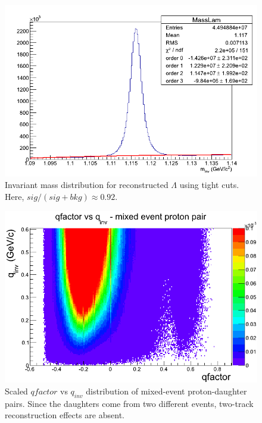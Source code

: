 \begin{figure}[hbtp]
\includegraphics[scale=0.5]{11h_V0_MassLam_TightCuts.png}
\caption[Invariant mass distribution for reconstructed $\Lambda$ using tight cuts]{Invariant mass distribution for reconstructed $\Lambda$ using tight cuts.  Here, $sig/(sig+bkg) \approx 0.92$.}
\label{fig:MassTightCut}
\end{figure}

\begin{figure}[hbtp]
\includegraphics[scale=0.5]{Qfac_MixedEvent.png}
\caption[$qfactor$ vs $q_{inv}$ distribution of mixed-event pairs]{Scaled $qfactor$ vs $q_{inv}$ distribution of mixed-event proton-daughter pairs.  Since the daughters come from two different events, two-track reconstruction effects are absent.}
\label{fig:QfacMixed}
\end{figure}

